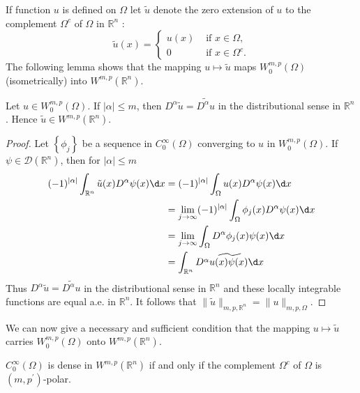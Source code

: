 \begin{para}
  If function $u$ is defined on $\Omega$ let $\tilde{u}$ denote the zero extension of $u$
  to the complement $\Omega^c$ of $\Omega$ in $\mathbb{R}^n$ :
  \[
  \tilde{u}(x)= \begin{cases}u(x) & \text { if } x \in \Omega, \\ 0 & \text { if } x \in \Omega^c .\end{cases}
  \]
  The following lemma shows that the mapping $u \mapsto \tilde{u}$
  maps $W_0^{m, p}(\Omega)$ (isometrically) into $W^{m,p}\left(\mathbb{R}^n\right)$.
\end{para}

\begin{lemma}
  Let $u \in W_0^{m, p}(\Omega)$. If $|\alpha| \leq m$,
  then $D^\alpha \tilde{u}=\widetilde{D^\alpha u}$ in the distributional sense in $\mathbb{R}^n$. 
  Hence $\tilde{u} \in W^{m,p}\left(\mathbb{R}^n\right)$.
\end{lemma}

\begin{proof}
  Let $\left\{\phi_j\right\}$ be a sequence in $C_0^{\infty}(\Omega)$ converging to $u$ in $W_0^{m, p}(\Omega)$. If $\psi \in \mathscr{D}\left(\mathbb{R}^n\right)$, then for $|\alpha| \leq m$
  \[
  \begin{aligned}
  (-1)^{|\alpha|} \int_{\mathbb{R}^n} \tilde{u}(x) D^\alpha \psi(x) \d x & =(-1)^{|\alpha|} \int_{\Omega} u(x) D^\alpha \psi(x) \d x \\
  & =\lim _{j \rightarrow \infty}(-1)^{|\alpha|} \int_{\Omega} \phi_j(x) D^\alpha \psi(x) \d x \\
  & =\lim _{j \rightarrow \infty} \int_{\Omega} D^\alpha \phi_j(x) \psi(x) \d x \\
  & =\int_{\mathbb{R}^n} \widetilde{D^\alpha u(x) \psi(x) \d x}
  \end{aligned}
  \]
  Thus $D^\alpha \tilde{u}=\widetilde{D^\alpha u}$ in the distributional sense
  in $\mathbb{R}^n$ and these locally integrable functions are equal a.e. in $\mathbb{R}^n$.
  It follows that $\|\tilde{u}\|_{m, p, \mathbb{R}^n}=\|u\|_{m, p, \Omega}$.
\end{proof}

We can now give a necessary and sufficient condition that the mapping $u \mapsto \tilde{u}$ 
carries $W_0^{m, p}(\Omega)$ onto $W^{m,p}\left(\mathbb{R}^n\right)$.

\begin{theorem}
  $C_0^{\infty}(\Omega)$ is dense in $W^{m,p}\left(\mathbb{R}^n\right)$ if and only if the 
  complement $\Omega^c$ of $\Omega$ is $\left(m, p^{\prime}\right)$-polar.
\end{theorem}

